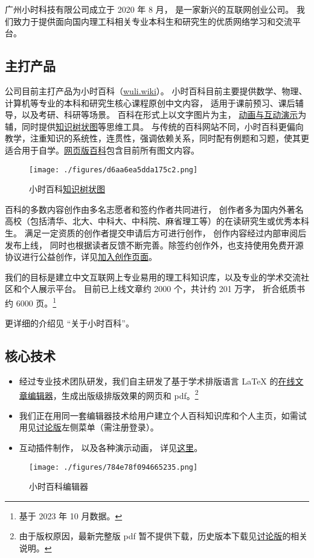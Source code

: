 
广州小时科技有限公司成立于 2020 年 8 月， 是一家新兴的互联网创业公司。 我们致力于提供面向国内理工科相关专业本科生和研究生的优质网络学习和交流平台。

\subsection{主打产品}
公司目前主打产品为小时百科（\href{https://wuli.wiki}{wuli.wiki}）。 小时百科目前主要提供数学、物理、计算机等专业的本科和研究生核心课程原创中文内容， 适用于课前预习、课后辅导，以及考研、科研等场景。 百科在形式上以文字图片为主， \href{https://wuli.wiki/apps/}{动画与互动演示}为辅，同时提供\href{https://wuli.wiki/tree/}{知识树状图}等思维工具。 与传统的百科网站不同，小时百科更偏向教学，注重知识的系统性，连贯性，强调依赖关系，同时配有例题和习题，使其更适合用于自学。\href{https://wuli.wiki/online/}{网页版百科}包含目前所有图文内容。

\begin{figure}[ht]
\centering
\texttt{[image: ./figures/d6aa6ea5dda175c2.png]}
\caption{小时百科\href{https://wuli.wiki/tree/}{知识树状图}} \label{fig_Compny_2}
\end{figure}

百科的多数内容创作由多名志愿者和签约作者共同进行， 创作者多为国内外著名高校（包括清华、北大、中科大、中科院、麻省理工等）的在读研究生或优秀本科生。 满足一定资质的创作者提交申请后方可进行创作， 创作内容经过内部审阅后发布上线， 同时也根据读者反馈不断完善。除签约创作外，也支持使用免费开源协议进行公益创作，详见\href{https://wuli.wiki/forum/f9ec7f8e-ca37-4278-a77e-ba5c0e40e115}{加入创作页面}。

我们的目标是建立中文互联网上专业易用的理工科知识库，以及专业的学术交流社区和个人展示平台。 目前已上线文章约 2000 个，共计约 201 万字， 折合纸质书约 6000 页。\footnote{基于 2023 年 10 月数据。}

更详细的介绍见 “关于小时百科”。

\subsection{核心技术}
\begin{itemize}
\item 经过专业技术团队研发，我们自主研发了基于学术排版语言 LaTeX 的\href{https://wuli.wiki/editor/}{在线文章编辑器}，生成出版级排版效果的网页和 pdf。\footnote{由于版权原因，最新完整版 pdf 暂不提供下载，历史版本下载见\href{https://wuli.wiki/forum/}{讨论版}的相关说明。} 
\item 我们正在用同一套编辑器技术给用户建立个人百科知识库和个人主页，如需试用见\href{https://wuli.wiki/forum/}{讨论版}左侧菜单（需注册登录）。
\item 互动插件制作， 以及各种演示动画， 详见\href{http://wuli.wiki/apps}{这里}。
\end{itemize}

\begin{figure}[ht]
\centering
\texttt{[image: ./figures/784e78f094665235.png]}
\caption{小时百科编辑器} \label{fig_Compny_1}
\end{figure}
